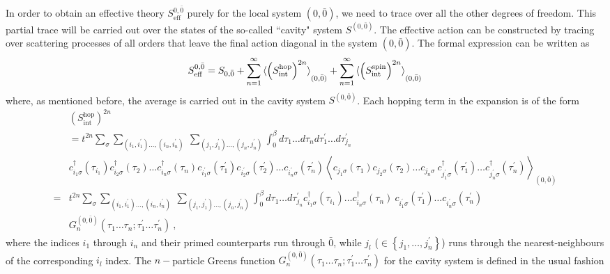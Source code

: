 In order to obtain an effective theory \(S^{0,{\bar 0}}_\text{eff}\) purely for the local system \((0,{\bar 0})\), we need to trace over all the other degrees of freedom. This partial trace will be carried out over the states of the so-called ``cavity" system \(S^{(0,{\bar 0})}\). The effective action can be constructed by tracing over scattering processes of all orders that leave the final action diagonal in the system \((0,{\bar 0})\). The formal expression can be written as
\begin{equation}\begin{aligned}
	S^{0,{\bar 0}}_\text{eff} = S_{0,{\bar 0}} + \sum_{n=1}^\infty \braket{\left(S_\text{int}^\text{hop}\right)^{2n}}_{(0,{\bar 0})} + \sum_{n=1}^\infty \braket{\left(S_\text{int}^\text{spin}\right)^{2n}}_{(0,{\bar 0})}
\end{aligned}\end{equation}
where, as mentioned before, the average is carried out in the cavity system \(S^{(0,{\bar 0})}\). Each hopping term in the expansion is of the form
\begin{equation}\begin{aligned}
	&\left(S_\text{int}^\text{hop}\right)^{2n} \\
	&= t^{2n}\sum_\sigma\sum_{(i_1, i_1^\prime)\ldots, (i_n, i_n^\prime)} ~\sum_{(j_1, j_1^\prime)\ldots, (j_n, j_n^\prime)} \int_0^\beta d\tau_{1}\ldots d\tau_{n}d\tau_{1}^\prime\ldots d\tau_{j_n}^\prime\\
			   &c^\dagger_{i_1\sigma}(\tau_{i_1})c^\dagger_{i_2\sigma}(\tau_{2})\ldots c^\dagger_{i_n\sigma}(\tau_{n}) c_{i_1^\prime\sigma}(\tau_{1}^\prime)c_{i_2^\prime\sigma}(\tau_{2}^\prime)\ldots c_{i_n^\prime\sigma}(\tau_{n}^\prime)\left<c_{j_1\sigma}(\tau_{1})c_{j_2\sigma}(\tau_{2})\ldots c_{j_n\sigma} ~ c^\dagger_{j_1^\prime\sigma}(\tau_{1}^\prime)\ldots c^\dagger_{j_n^\prime\sigma}(\tau_{n}^\prime) \right>_{(0,{\bar 0})}\\
	=& t^{2n}\sum_\sigma\sum_{(i_1, i_1^\prime)\ldots, (i_n, i_n^\prime)} ~\sum_{(j_1, j_1^\prime)\ldots, (j_n, j_n^\prime)} \int_0^\beta d\tau_{1}\ldots d\tau_{j_n}^\prime c^\dagger_{i_1\sigma}(\tau_{i_1})\ldots c^\dagger_{i_n\sigma}(\tau_{n})~c_{i_1^\prime\sigma}(\tau_{1}^\prime)\ldots c_{i_n^\prime\sigma}(\tau_{n}^\prime)\\
	 &G_n^{(0,\bar 0)}\left(\tau_1\ldots \tau_n; \tau_1^\prime\ldots \tau_n^\prime\right)~,
\end{aligned}\end{equation}
where the indices \(i_1\) through \(i_n\) and their primed counterparts run through \(\bar 0\), while \(j_l\) (\(\in \left\{j_1,\ldots,j_n^\prime\right\}\)) runs through the nearest-neighbours of the corresponding \(i_l\) index. The \(n-\)particle Greens function \(G_n^{(0,\bar 0)}\left(\tau_1\ldots \tau_n; \tau_1^\prime\ldots \tau_n^\prime\right)\) for the cavity system is defined in the usual fashion
